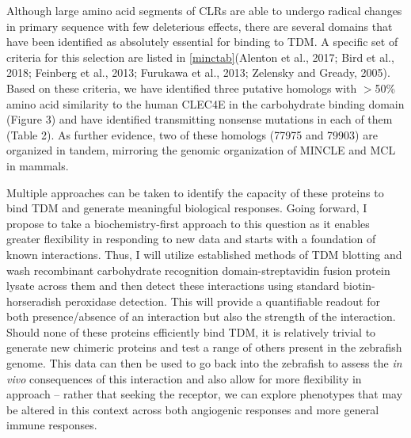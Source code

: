 Although large amino acid segments of CLRs are able to undergo radical changes in primary sequence with few deleterious effects, there are several domains that have been identified as absolutely essential for binding to TDM. A specific set of criteria for this selection are listed in \autoref{minctab}(Alenton et al., 2017; Bird et al., 2018; Feinberg et al., 2013; Furukawa et al., 2013; Zelensky and Gready, 2005). Based on these criteria, we have identified three putative homologs with $>$50\% amino acid similarity to the human CLEC4E in the carbohydrate binding domain (Figure 3) and have identified transmitting nonsense mutations in each of them (Table 2). As further evidence, two of these homologs (77975 and 79903) are organized in tandem, mirroring the genomic organization of MINCLE and MCL in mammals. 

Multiple approaches can be taken to identify the capacity of these proteins to bind TDM and generate meaningful biological responses. Going forward, I propose to take a biochemistry-first approach to this question as it enables greater flexibility in responding to new data and starts with a foundation of known interactions. Thus, I will utilize established methods of TDM blotting \citep{Jegouzo2014} and wash recombinant carbohydrate recognition domain-streptavidin fusion protein lysate across them and then detect these interactions using standard biotin-horseradish peroxidase detection. This will provide a quantifiable readout for both presence/absence of an interaction but also the strength of the interaction. Should none of these proteins efficiently bind TDM, it is relatively trivial to generate new chimeric proteins and test a range of others present in the zebrafish genome. This data can then be used to go back into the zebrafish to assess the \textit{in vivo} consequences of this interaction and also allow for more flexibility in approach -- rather that seeking the receptor, we can explore phenotypes that may be altered in this context across both angiogenic responses and more general immune responses.

